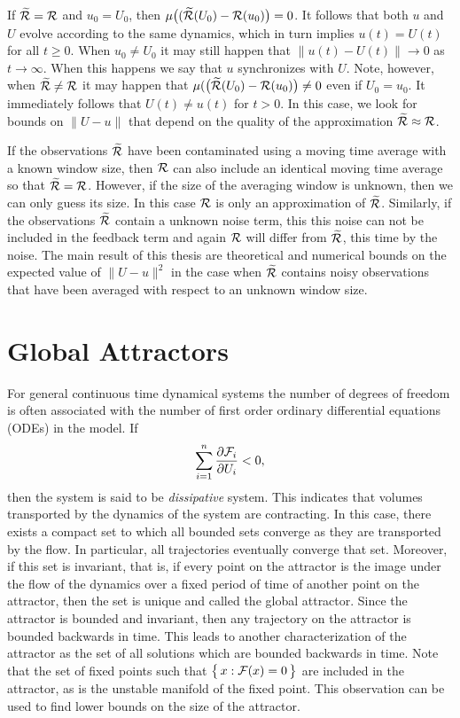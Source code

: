 \documentclass[master,tocprelim,12pt]{unrthesis}
\theoremstyle{definition}
\newcommand{\cF}{{\mathcal F}}
\numberwithin{equation}{chapter}
\begin{document}
\begin{manuscript}
If $\widetilde{\cal R}={\cal R}$ and $u_0=U_0$, then
$\mu\big((\widetilde{\cal R}(U_0) - {\cal R}(u_0)\big)= 0$.
It follows that both $u$ and $U$ evolve according to the same
dynamics, which in turn implies $u(t)=U(t)$ for all $t\ge 0$.
When $u_0\ne U_0$ it may still happen
that $\|u(t)-U(t)\|\to 0$ as $t\to\infty$.
When this happens we say that $u$ synchronizes with $U$.
Note, however, when $\widetilde{\cal R}\ne{\cal R}$ it
may happen that
$\mu(\big(\widetilde{\cal R}(U_0) - {\cal R}(u_0)\big)\ne 0$
even if $U_0=u_0$.
It immediately follows that $U(t)\ne u(t)$ for $t>0$.
In this case, we look for bounds on $\|U-u\|$ that depend
on the quality of the approximation $\widetilde{\cal R}\approx{\cal R}$.

If the observations $\widetilde{\cal R}$ have been 
contaminated using a moving time average with a known window size,
then ${\cal R}$ can also include an identical moving time average
so that $\widetilde{\cal R}={\cal R}$.  However, if the size of
the averaging window is unknown, then we can only guess its size.
In this case ${\cal R}$ is only an approximation of $\widetilde{\cal R}$.
Similarly, if the observations $\widetilde{\cal R}$ contain a 
unknown noise term, this this noise can not be included in the 
feedback term and again ${\cal R}$ will differ from 
$\widetilde{\cal R}$, this time by the noise.
The main result of this thesis are theoretical and numerical
bounds on the expected value of $\|U-u\|^2$ in the case 
when $\widetilde{\cal R}$
contains noisy observations that have been averaged with
respect to an unknown window size.



\section{Global Attractors}

For general continuous time dynamical systems the number of degrees of freedom
is often associated with the number of first order ordinary differential
equations (ODEs) in the model.  If
$$ 
\displaystyle\sum_{i=1}^n{\partial \cF_i \over \partial U_i }< 0,
$$
then the system is said to be
\emph{dissipative} system.
This indicates that volumes transported by the dynamics of
the system are contracting.
In this case, there exists a compact set to which all bounded 
sets converge as they are transported by the flow.
In particular, all trajectories eventually converge that set.
Moreover, if this set is invariant, that is, if every point on
the attractor is the image under the flow of the
dynamics over a fixed period of time of another point on the attractor, 
then the set is unique and called the global attractor.
Since the attractor is bounded and invariant, then any trajectory 
on the attractor is bounded backwards in time.
This leads to another characterization of the attractor
as the set of all solutions which are bounded backwards
in time.  
Note that the set of fixed points such that 
$\big\{\, x : {\cal F}(x)=0 \,\big\}$ are included in the attractor,
as is the unstable manifold of the fixed point.
This observation can be used to find lower bounds on the
size of the attractor.



\end{manuscript}
\end{document}
